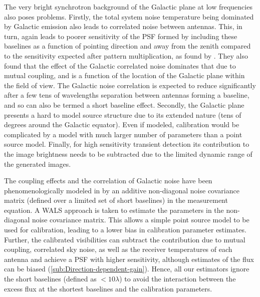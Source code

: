 \documentclass{aa}
\begin{document}
The very bright synchrotron background  of the Galactic plane at low frequencies
also poses problems. Firstly, the total system noise temperature being dominated
by Galactic emission  also leads to correlated noise  between antennas. This, in
turn, again  leads to poorer  sensitivity of the  PSF formed by  including these
baselines as a function of pointing  direction and away from the zenith compared
to  the   sensitivity  expected  after  pattern  multiplication,   as  found  by
\citet{ellingson2011sensitivity}.   They  also  found  that the  effect  of  the
Galactic  correlated noise  dominates  that due  to  mutual coupling,  and is  a
function of  the location of  the Galactic plane  within the field of  view. The
Galactic noise correlation is expected  to reduce significantly after a few tens
of wavelengths separation  between antennas forming a baseline,  and so can also
be termed a short baseline effect.  Secondly, the Galactic plane presents a hard
to model source structure due to its extended nature (tens of degrees around the
Galactic equator).  Even if modeled, calibration would be complicated by a model
with much larger  number of parameters than a point  source model.  Finally, for
high sensitivity  transient detection its  contribution to the  image brightness
needs to be subtracted due to the limited dynamic range of the generated images.

The  coupling  effects   and  the  correlation  of  Galactic   noise  have  been
phenomenologically   modeled  in   \citet{wijnholds2010self}   by  an   additive
non-diagonal  noise covariance  matrix  (defined  over a  limited  set of  short
baselines) in the measurement equation. A WALS approach is taken to estimate the
parameters in  the non-diagonal noise  covariance matrix.  This allows  a simple
point  source model  to be  used for  calibration, leading  to a  lower  bias in
calibration  parameter  estimates.   Further,  the calibrated  visibilities  can
subtract the contribution due to  mutual coupling, correlated sky noise, as well
as  the receiver  temperatures of  each antenna  and achieve  a PSF  with higher
sensitivity,    although    estimates    of    the   flux    can    be    biased
(\ref{sub:Direction-dependent-gain}).   Hence,  all  our estimators  ignore  the
short baselines (defined  as $<10\lambda$) to avoid the  interaction between the
excess flux at the shortest baselines and the calibration parameters.

\end{document}
